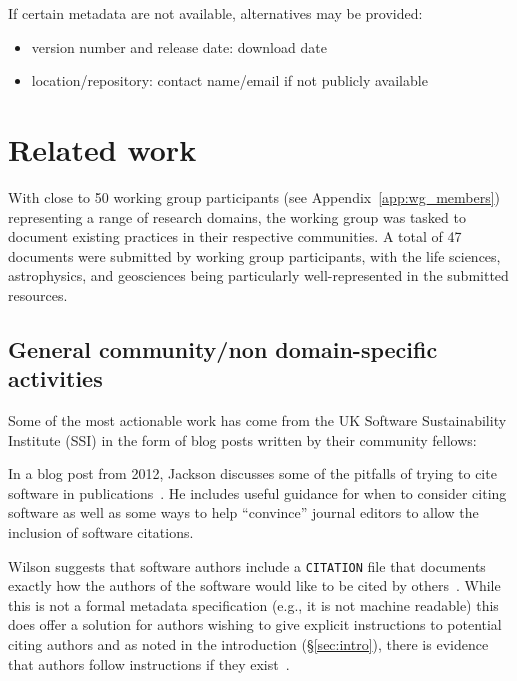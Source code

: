 \documentclass[11pt, oneside]{amsart}
\begin{document}
If certain metadata are not available, alternatives may be provided:
\begin{itemize}
\item version number and release date: download date
\item location\slash repository: contact name\slash email if not publicly
  available
\end{itemize}


\section{Related work}
\label{sec:related_work}

With close to 50 working group participants (see Appendix~\ref{app:wg_members}) representing a range of research domains, the working group was tasked to
document existing practices in their respective communities. A total of 47 documents were submitted by working group
participants, with the life sciences, astrophysics, and geosciences being particularly well-represented in the submitted
resources.

\subsection{General community/non domain-specific activities}

Some of the most actionable work has come from the UK Software Sustainability Institute (SSI) in the form of blog posts written by their community fellows:

In a blog post from 2012, Jackson discusses some of the pitfalls of trying to cite software in publications~\cite{ssi-how-to-cite}.
He includes useful guidance for when to consider citing software as well as some ways to help ``convince'' journal editors
to allow the inclusion of software citations.

Wilson suggests that software authors include a \texttt{CITATION} file that documents exactly how the authors of the software would like to be cited by others~\cite{ssi-citation-files}. While this is not a formal metadata specification (e.g., it is not machine readable) this does offer a solution for authors wishing to give explicit instructions to potential citing authors and as noted in the introduction (\S\ref{sec:intro}), there is evidence that authors follow instructions if they exist~\cite{10.1371/journal.pone.0136631}.
\end{document}
